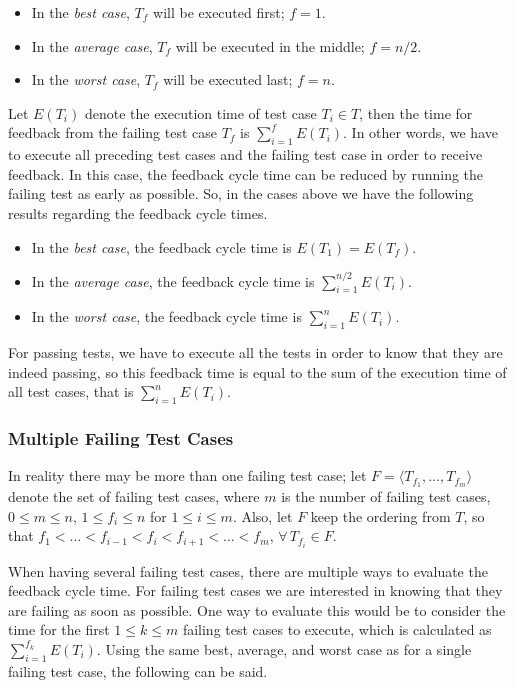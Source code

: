 \documentclass[a4paper,english,12pt]{report}
\begin{document}
\begin{itemize}
  \item In the \textit{best case}, $T_f$ will be executed first; $f = 1$.
  \item In the \textit{average case}, $T_f$ will be executed in the middle; $f = n/2$.
  \item In the \textit{worst case}, $T_f$ will be executed last; $f = n$.
\end{itemize}

Let $E(T_i)$ denote the execution time of test case $T_i \in T$, then the time for feedback from the failing test case $T_f$ is $\sum_{i=1}^{f}E(T_i)$. In other words, we have to execute all preceding test cases and the failing test case in order to receive feedback. In this case, the feedback cycle time can be reduced by running the failing test as early as possible. So, in the cases above we have the following results regarding the feedback cycle times.

\begin{itemize}
  \item In the \textit{best case}, the feedback cycle time is $E(T_1)=E(T_f)$.
  \item In the \textit{average case}, the feedback cycle time is $\sum_{i=1}^{n/2}E(T_i)$.
  \item In the \textit{worst case}, the feedback cycle time is $\sum_{i=1}^{n}E(T_i)$.
\end{itemize}

For passing tests, we have to execute all the tests in order to know that they are indeed passing, so this feedback time is equal to the sum of the execution time of all test cases, that is $\sum_{i=1}^{n}E(T_i)$.

\subsubsection{Multiple Failing Test Cases}
In reality there may be more than one failing test case; let $F = \langle T_{f_1},\ldots,T_{f_m} \rangle$ denote the set of failing test cases, where $m$ is the number of failing test cases, $0 \leq m \leq n$, $1 \leq f_i \leq n$ for $1 \leq i \leq m$. Also, let $F$ keep the ordering from $T$, so that $f_1 < \ldots < f_{i-1} < f_i < f_{i+1} < \ldots < f_m$, $\forall\,T_{f_i} \in F$.

When having several failing test cases, there are multiple ways to evaluate the feedback cycle time. For failing test cases we are interested in knowing that they are failing as soon as possible. One way to evaluate this would be to consider the time for the first $1 \leq k \leq m$ failing test cases to execute, which is calculated as $\sum_{i=1}^{f_k} E(T_i)$. Using the same best, average, and worst case as for a single failing test case, the following can be said.
\end{document}
